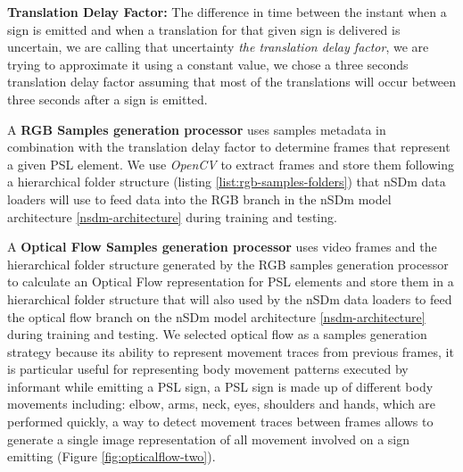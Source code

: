 \documentclass[twocolumn,conference]{article}
\begin{document}
\textbf{Translation Delay Factor: } The difference in time between the instant when a sign is emitted and when a translation for that given sign is delivered is uncertain, we are calling that uncertainty \textit{the translation delay factor}, we are trying to approximate it using a constant value, we chose a three seconds translation delay factor assuming that most of the translations will occur between three seconds after a sign is emitted.

A \textbf{RGB Samples generation processor} uses samples metadata in combination with the translation delay factor to determine frames that represent a given PSL element. We use \textit{OpenCV} to extract frames and store them following a hierarchical folder structure (listing \ref{list:rgb-samples-folders}) that nSDm data loaders will use to feed data into the RGB branch in the nSDm model architecture \ref{nsdm-architecture} during training and testing.

A \textbf{Optical Flow Samples generation processor} uses video frames and the hierarchical folder structure generated by the RGB samples generation processor to calculate an Optical Flow representation for PSL elements and store them in a hierarchical folder structure that will also used by the nSDm data loaders to feed the optical flow branch on the nSDm model architecture \ref{nsdm-architecture} during training and testing. We selected optical flow as a samples generation strategy because its ability to represent movement traces from previous frames, it is particular useful for representing body movement patterns executed by informant while emitting a PSL sign, a PSL sign is made up of different body movements including: elbow, arms, neck, eyes, shoulders and hands, which are performed quickly, a way to detect movement traces between frames allows to generate a single image representation of all movement involved on a sign emitting (Figure \ref{fig:opticalflow-two}). 
\end{document}
